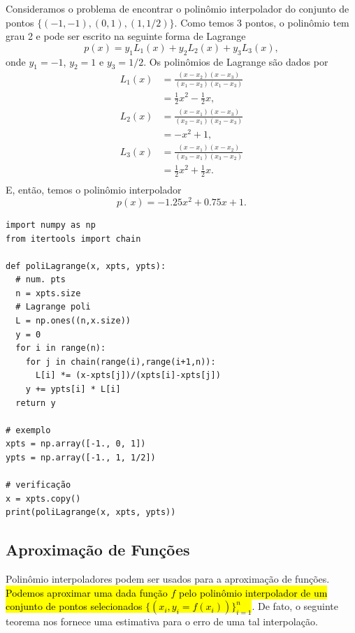 \begin{ex}
  Consideramos o problema de encontrar o polinômio interpolador do conjunto de pontos $\{(-1, -1), (0, 1), (1, 1/2)\}$. Como temos 3 pontos, o polinômio tem grau 2 e pode ser escrito na seguinte forma de Lagrange
  \begin{equation}
    p(x) = y_1L_1(x) + y_2L_2(x) + y_3L_3(x),
  \end{equation}
  onde $y_1 = -1$, $y_2 = 1$ e $y_3 = 1/2$. Os polinômios de Lagrange são dados por
  \begin{align}
    L_1(x) &= \frac{(x-x_2)(x-x_3)}{(x_1-x_2)(x_1-x_3)} \\
           &= \frac{1}{2}x^2 - \frac{1}{2}x,\\
    L_2(x) &= \frac{(x-x_1)(x-x_3)}{(x_2-x_1)(x_2-x_3)} \\
           &= -x^2 + 1,\\
    L_3(x) &= \frac{(x-x_1)(x-x_2)}{(x_3-x_1)(x_3-x_2)} \\
           &= \frac{1}{2}x^2 + \frac{1}{2}x.\\
  \end{align}
  E, então, temos o polinômio interpolador
  \begin{equation}
    p(x) = -1.25x^2 + 0.75x + 1.
  \end{equation}

\begin{lstlisting}[caption=poliLagrange.py]
import numpy as np
from itertools import chain

def poliLagrange(x, xpts, ypts):
  # num. pts
  n = xpts.size
  # Lagrange poli
  L = np.ones((n,x.size))
  y = 0
  for i in range(n):
    for j in chain(range(i),range(i+1,n)):
      L[i] *= (x-xpts[j])/(xpts[i]-xpts[j])
    y += ypts[i] * L[i]
  return y

# exemplo
xpts = np.array([-1., 0, 1])
ypts = np.array([-1., 1, 1/2])

# verificação
x = xpts.copy()
print(poliLagrange(x, xpts, ypts))
\end{lstlisting}

\end{ex}

\subsection{Aproximação de Funções}

Polinômio interpoladores podem ser usados para a aproximação de funções. \hl{Podemos aproximar uma dada função $f$ pelo polinômio interpolador de um conjunto de pontos selecionados $\{(x_i, y_i=f(x_i))\}_{i=1}^n$}. De fato, o seguinte teorema nos fornece uma estimativa para o erro de uma tal interpolação.

